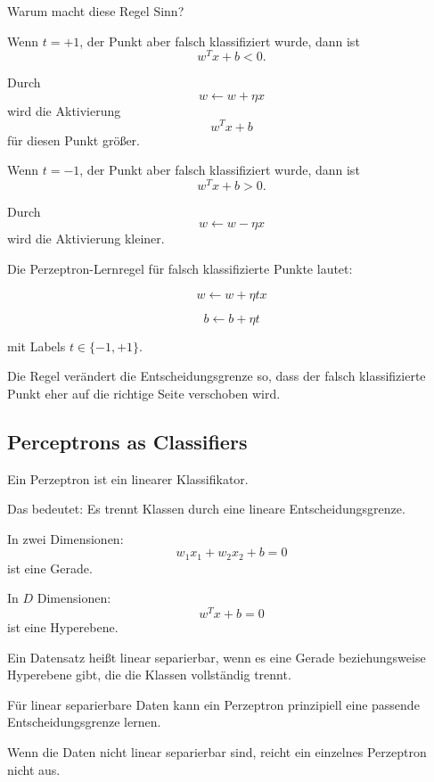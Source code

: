 \documentclass[11pt,a4paper]{scrartcl}
\begin{document}
\begin{sidecalcbox}
    Warum macht diese Regel Sinn?

    Wenn \(t=+1\), der Punkt aber falsch klassifiziert wurde, dann ist
    \[
        w^T x + b < 0.
    \]

    Durch
    \[
        w \leftarrow w + \eta x
    \]
    wird die Aktivierung
    \[
        w^T x + b
    \]
    für diesen Punkt größer.

    Wenn \(t=-1\), der Punkt aber falsch klassifiziert wurde, dann ist
    \[
        w^T x + b > 0.
    \]

    Durch
    \[
        w \leftarrow w - \eta x
    \]
    wird die Aktivierung kleiner.
\end{sidecalcbox}

\begin{answerbox}
    Die Perzeptron-Lernregel für falsch klassifizierte Punkte lautet:

    \[
        \boxed{
            w \leftarrow w + \eta t x
        }
    \]

    \[
        \boxed{
            b \leftarrow b + \eta t
        }
    \]

    mit Labels \(t \in \{-1,+1\}\).

    Die Regel verändert die Entscheidungsgrenze so, dass der falsch
    klassifizierte Punkt eher auf die richtige Seite verschoben wird.
\end{answerbox}

\subsection{Perceptrons as Classifiers}

\begin{notebox}
    Ein Perzeptron ist ein linearer Klassifikator.

    Das bedeutet: Es trennt Klassen durch eine lineare Entscheidungsgrenze.

    In zwei Dimensionen:
    \[
        w_1x_1 + w_2x_2 + b = 0
    \]
    ist eine Gerade.

    In \(D\) Dimensionen:
    \[
        w^T x + b = 0
    \]
    ist eine Hyperebene.
\end{notebox}

\begin{solutionbox}
    Ein Datensatz heißt linear separierbar, wenn es eine Gerade beziehungsweise
    Hyperebene gibt, die die Klassen vollständig trennt.

    Für linear separierbare Daten kann ein Perzeptron prinzipiell eine passende
    Entscheidungsgrenze lernen.

    Wenn die Daten nicht linear separierbar sind, reicht ein einzelnes Perzeptron
    nicht aus.
\end{solutionbox}
\end{document}
